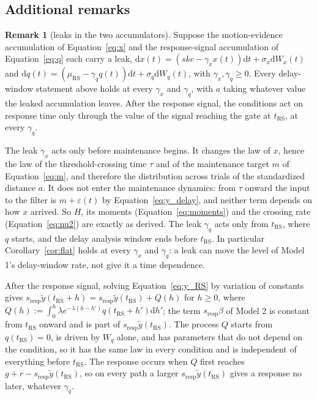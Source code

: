 \documentclass[a4paper,11pt]{article}
\theoremstyle{definition}
\newtheorem{remark}[proposition]{Remark}
\newcommand{\dd}{\mathrm d}
\newcommand{\1}{\mathbbm{1}}
\begin{document}
\subsection{Additional remarks}


\begin{remark}[leaks in the two accumulators]\label{rem:leak}
Suppose the motion-evidence accumulation of Equation~\eqref{eq:x} and the response-signal accumulation of Equation~\eqref{eq:q} each carry a leak, $\dd x\left(t\right)=\left(skc-{\gamma }_{x}x\left(t\right)\right)\dd t+{\sigma }_{x}\dd {W}_{x}\left(t\right)$ and $\dd q\left(t\right)=\left({\mu }_{\mathrm{RS}}-{\gamma }_{q}q\left(t\right)\right)\dd t+{\sigma }_{q}\dd {W}_{q}\left(t\right)$, with ${\gamma }_{x},{\gamma }_{q}\ge 0$. Every delay-window statement above holds at every ${\gamma }_{x}$ and ${\gamma }_{q}$, with $a$ taking whatever value the leaked accumulation leaves. After the response signal, the conditions act on response time only through the value of the signal reaching the gate at ${t}_{\mathrm{RS}}$, at every ${\gamma }_{q}$.
\end{remark}

The leak ${\gamma }_{x}$ acts only before maintenance begins. It changes the law of $x$, hence the law of the threshold-crossing time $\tau $ and of the maintenance target $m$ of Equation~\eqref{eq:m}, and therefore the distribution across trials of the standardized distance $a$. It does not enter the maintenance dynamics: from $\tau $ onward the input to the filter is $m+\varepsilon \left(t\right)$ by Equation~\eqref{eq:y_delay}, and neither term depends on how $x$ arrived. So $H$, its moments (Equation~\eqref{eq:moments}) and the crossing rate (Equation~\eqref{eq:nu2}) are exactly as derived. The leak ${\gamma }_{q}$ acts only from ${t}_{\mathrm{RS}}$, where $q$ starts, and the delay analysis window ends before ${t}_{\mathrm{RS}}$. In particular Corollary~\ref{cor:flat} holds at every ${\gamma }_{x}$ and ${\gamma }_{q}$: a leak can move the level of Model 1's delay-window rate, not give it a time dependence.

After the response signal, solving Equation~\eqref{eq:y_RS} by variation of constants gives ${s}_{\mathrm{resp}}\tilde{y}\left({t}_{\mathrm{RS}}+h\right)={s}_{\mathrm{resp}}\tilde{y}\left({t}_{\mathrm{RS}}\right)+Q\left(h\right)$ for $h\ge 0$, where $Q\left(h\right):=\int_{0}^{h}\lambda {e}^{-\lambda \left(h-h'\right)}q\left({t}_{\mathrm{RS}}+h'\right)\dd h'$; the term ${s}_{\mathrm{resp}}\beta $ of Model 2 is constant from ${t}_{\mathrm{RS}}$ onward and is part of ${s}_{\mathrm{resp}}\tilde{y}\left({t}_{\mathrm{RS}}\right)$. The process $Q$ starts from $q\left({t}_{\mathrm{RS}}\right)=0$, is driven by ${W}_{q}$ alone, and has parameters that do not depend on the condition, so it has the same law in every condition and is independent of everything before ${t}_{\mathrm{RS}}$. The response occurs when $Q$ first reaches $g+r-{s}_{\mathrm{resp}}\tilde{y}\left({t}_{\mathrm{RS}}\right)$, so on every path a larger ${s}_{\mathrm{resp}}\tilde{y}\left({t}_{\mathrm{RS}}\right)$ gives a response no later, whatever ${\gamma }_{q}$.
\end{document}
